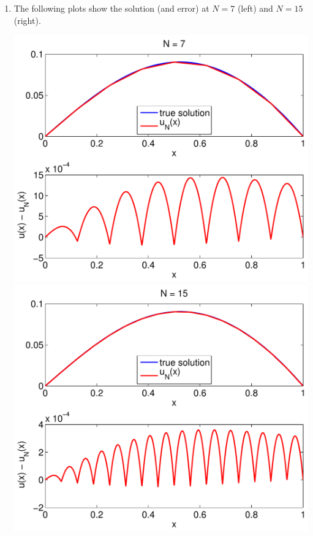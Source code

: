 {\begin{solution}
\begin{enumerate}
\item The following plots show the solution (and error) at $N=7$ (left) and $N=15$ (right).
\begin{center} \includegraphics[scale=0.4]{fema7} \quad
               \includegraphics[scale=0.4]{fema15} 
\end{center}


\end{enumerate}
\end{solution}}
